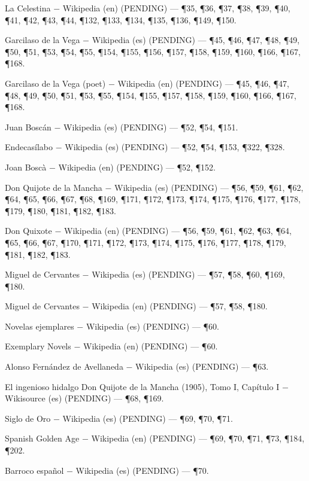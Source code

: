 \documentclass{book}
\begin{document}
\noindent La Celestina \(-\) Wikipedia (en) (PENDING) --- \P35, \P36, \P37, \P38, \P39, \P40, \P41, \P42, \P43, \P44, \P132, \P133, \P134, \P135, \P136, \P149, \P150.

\noindent Garcilaso de la Vega \(-\) Wikipedia (es) (PENDING) --- \P45, \P46, \P47, \P48, \P49, \P50, \P51, \P53, \P54, \P55, \P154, \P155, \P156, \P157, \P158, \P159, \P160, \P166, \P167, \P168.

\noindent Garcilaso de la Vega (poet) \(-\) Wikipedia (en) (PENDING) --- \P45, \P46, \P47, \P48, \P49, \P50, \P51, \P53, \P55, \P154, \P155, \P157, \P158, \P159, \P160, \P166, \P167, \P168.

\noindent Juan Boscán \(-\) Wikipedia (es) (PENDING) --- \P52, \P54, \P151.

\noindent Endecasílabo \(-\) Wikipedia (es) (PENDING) --- \P52, \P54, \P153, \P322, \P328.

\noindent Joan Boscà \(-\) Wikipedia (en) (PENDING) --- \P52, \P152.

\noindent Don Quijote de la Mancha \(-\) Wikipedia (es) (PENDING) --- \P56, \P59, \P61, \P62, \P64, \P65, \P66, \P67, \P68, \P169, \P171, \P172, \P173, \P174, \P175, \P176, \P177, \P178, \P179, \P180, \P181, \P182, \P183.

\noindent Don Quixote \(-\) Wikipedia (en) (PENDING) --- \P56, \P59, \P61, \P62, \P63, \P64, \P65, \P66, \P67, \P170, \P171, \P172, \P173, \P174, \P175, \P176, \P177, \P178, \P179, \P181, \P182, \P183.

\noindent Miguel de Cervantes \(-\) Wikipedia (es) (PENDING) --- \P57, \P58, \P60, \P169, \P180.

\noindent Miguel de Cervantes \(-\) Wikipedia (en) (PENDING) --- \P57, \P58, \P180.

\noindent Novelas ejemplares \(-\) Wikipedia (es) (PENDING) --- \P60.

\noindent Exemplary Novels \(-\) Wikipedia (en) (PENDING) --- \P60.

\noindent Alonso Fernández de Avellaneda \(-\) Wikipedia (es) (PENDING) --- \P63.

\noindent El ingenioso hidalgo Don Quijote de la Mancha (1905), Tomo I, Capítulo I \(-\) Wikisource (es) (PENDING) --- \P68, \P169.

\noindent Siglo de Oro \(-\) Wikipedia (es) (PENDING) --- \P69, \P70, \P71.

\noindent Spanish Golden Age \(-\) Wikipedia (en) (PENDING) --- \P69, \P70, \P71, \P73, \P184, \P202.

\noindent Barroco español \(-\) Wikipedia (es) (PENDING) --- \P70.
\end{document}
